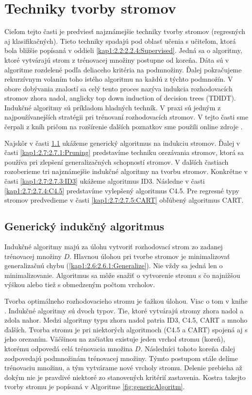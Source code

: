 \section{Techniky tvorby stromov}\label{kap1:2.7:DTTechniques}
Cieľom tejto časti je predviesť najznámejšie techniky tvorby stromov (regresných aj klasifikačných). Tieto techniky spadajú pod oblasť učenia s učiteľom, ktorá bola bližšie popísaná v oddieli \ref{kap1:2.2:2.2.4:Supervised}. Jedná sa o algoritmy, ktoré vytvárajú strom z trénovacej množiny postupne od koreňa. Dáta sú v algoritme rozdelené podľa deliaceho kritéria na podmnožiny. Ďalej pokračujeme rekurzívnym volaním toho istého algoritmu na každú z týchto podmnožín. V obore dobývania znalostí sa celý tento proces nazýva indukcia rozhodovacích stromov zhora nadol, anglicky top down induction of decision trees (TDIDT). Indukčné algoritmy sú príkladom hladných techník. V praxi sú jedným z najpoužívanejších stratégii pri trénovaní rozhodovacích stromov. V tejto časti sme čerpali z kníh \cite{kap1-DataMiningForTrees,kap1-DataMiningAndAnalysis} pričom na rozšírenie ďalších poznatkov sme použili online zdroje \cite{online-SplitCriterias,online-SplitCriteriasMatter,online-DTLectures}.

Najskôr v časti \ref{kap1:2.7:2.7.2:Generic} ukážeme generický algoritmus na indukciu stromov. Ďalej v časti \ref{kap1:2.7:2.7.1:Pruning} predstavíme techniku orezávania stromov, ktorá sa používa pri zlepšení generalizačných schopností stromov.  V ďalších častiach rozoberieme tri najznámejšie indukčné algoritmy na tvorbu stromov. Konkrétne v časti \ref{kap1:2.7:2.7.3:ID3} ukážeme algoritmus ID3. Následne v časti \ref{kap1:2.7:2.7.4:C4.5} predstavíme vylepšený algoritmus C4.5. Pre regresné typy stromov predvedieme v časti \ref{kap1:2.7:2.7.5:CART} obľúbený algoritmus CART.

\subsection{Generický indukčný algoritmus}\label{kap1:2.7:2.7.2:Generic}
Indukčné algoritmy majú za úlohu vytvoriť rozhodovací strom zo zadanej trénovacej množiny $D$. Hlavnou úlohou pri tvorbe stromov je minimalizovať generalizačnú chybu (\ref{kap1:2.6:2.6.1:Generalize}). Nie vždy sa jedná len o minimalizovanie. Algoritmus sa môže snažiť o vytvorenie stromu s čo najnižšou výškou alebo tiež s obmedzeným počtom vrcholov.

Tvorba optimálneho rozhodovacieho stromu je ťažkou úlohou. Viac o tom v knihe \cite[s.51]{kap1-DataMiningForTrees}. Indukčné algoritmy sú dvoch typov. Tie, ktoré vytvárajú stromy zhora nadol a zdola nahor. Medzi algoritmy typu zhora nadol patria ID3, C4.5, CART a mnoho ďalších. Tvorba stromu je pri niektorých algoritmoch (C4.5 a CART) spojená aj s jeho orezaním. Väčšinou na začiatku existuje jeden vrchol stromu (koreň), ktorému odpovedá celá trénovacia množina $D$. Následníci tohoto koreňa ďalej zodpovedajú podmnožinám trénovacej množiny. Týmto postupom stále delíme trénovaciu množinu, a tým vytvárame nové vrcholy stromu. Delenie prebieha až dokým nie je pravdivé niektoré zo stanovených kritérií zastavenia. Kostra takejto tvorby stromu je popísaná v Algoritme  \ref{fig:genericAlgoritm}.

